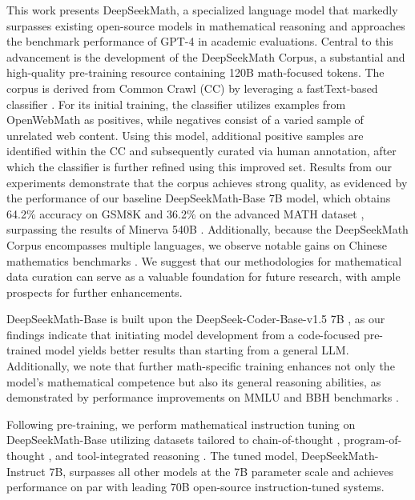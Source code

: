 This work presents DeepSeekMath, a specialized language model that markedly surpasses existing open-source models in mathematical reasoning and approaches the benchmark performance of GPT-4 in academic evaluations. Central to this advancement is the development of the DeepSeekMath Corpus, a substantial and high-quality pre-training resource containing 120B math-focused tokens. The corpus is derived from Common Crawl (CC) by leveraging a fastText-based classifier \citep{joulin2016fasttext}. For its initial training, the classifier utilizes examples from OpenWebMath \citep{openwebmath} as positives, while negatives consist of a varied sample of unrelated web content. Using this model, additional positive samples are identified within the CC and subsequently curated via human annotation, after which the classifier is further refined using this improved set. Results from our experiments demonstrate that the corpus achieves strong quality, as evidenced by the performance of our baseline DeepSeekMath-Base 7B model, which obtains 64.2\% accuracy on GSM8K \citep{gsm8k} and 36.2\% on the advanced MATH dataset \citep{MATH}, surpassing the results of Minerva 540B \citep{minerva}. Additionally, because the DeepSeekMath Corpus encompasses multiple languages, we observe notable gains on Chinese mathematics benchmarks \citep{wei2023cmath,agieval}. We suggest that our methodologies for mathematical data curation can serve as a valuable foundation for future research, with ample prospects for further enhancements.

DeepSeekMath-Base is built upon the DeepSeek-Coder-Base-v1.5 7B \citep{deepseek-coder}, as our findings indicate that initiating model development from a code-focused pre-trained model yields better results than starting from a general LLM. Additionally, we note that further math-specific training enhances not only the model’s mathematical competence but also its general reasoning abilities, as demonstrated by performance improvements on MMLU \citep{mmlu} and BBH benchmarks \citep{bbh}.

Following pre-training, we perform mathematical instruction tuning on DeepSeekMath-Base utilizing datasets tailored to chain-of-thought \citep{cot}, program-of-thought \citep{pot,pal}, and tool-integrated reasoning \citep{tora}. The tuned model, DeepSeekMath-Instruct 7B, surpasses all other models at the 7B parameter scale and achieves performance on par with leading 70B open-source instruction-tuned systems.

